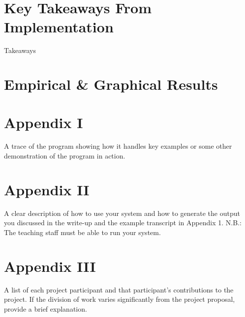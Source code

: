 \documentclass[twoside,11pt]{article}
\begin{document}
\section{Key Takeaways From Implementation}
Takeaways
\section{Empirical \& Graphical Results}

\section{Appendix I}
 A trace of the program showing how it handles key examples or some other demonstration of the program in action.
\section{Appendix II}
A clear description of how to use your system and how to generate the output you discussed in the write-up and the example transcript in Appendix 1. N.B.: The teaching staff must be able to run your system.
\section{Appendix III}
A list of each project participant and that participant’s contributions to the project. If the division of work varies significantly from the project proposal, provide a brief explanation.
\vskip 0.2in


\end{document}
